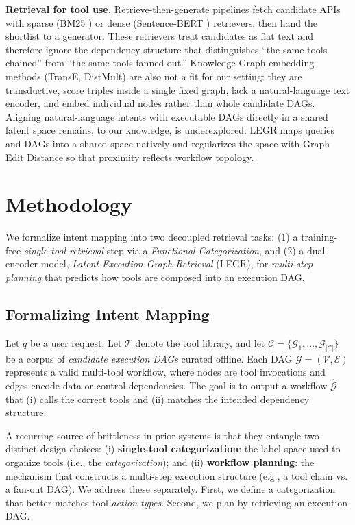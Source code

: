 \documentclass{article}
\begin{document}
\textbf{Retrieval for tool use.} Retrieve-then-generate pipelines fetch candidate APIs with sparse (BM25 \cite{robertson2009probabilistic}) or dense (Sentence-BERT \cite{reimers-gurevych-2019-sentence}) retrievers, then hand the shortlist to a generator. These retrievers treat candidates as flat text and therefore ignore the dependency structure that distinguishes ``the same tools chained'' from ``the same tools fanned out.'' Knowledge-Graph embedding methods (TransE, DistMult) are also not a fit for our setting: they are transductive, score triples inside a single fixed graph, lack a natural-language text encoder, and embed individual nodes rather than whole candidate DAGs. Aligning natural-language intents with executable DAGs directly in a shared latent space remains, to our knowledge, is underexplored. LEGR maps queries and DAGs into a shared space natively and regularizes the space with Graph Edit Distance \cite{sanfeliu1983distance} so that proximity reflects workflow topology.

\section{Methodology}

We formalize intent mapping into two decoupled retrieval tasks: (1) a training-free \emph{single-tool retrieval} step via a \emph{Functional Categorization}, and (2) a dual-encoder model, \textit{Latent Execution-Graph Retrieval} (LEGR), for \emph{multi-step planning} that predicts how tools are composed into an execution DAG.

\subsection{Formalizing Intent Mapping}
\label{sec:overview}
Let $q$ be a user request. Let $\mathcal{T}$ denote the tool library, and let $\mathcal{C} = \{\mathcal{G}_1,\dots,\mathcal{G}_{|\mathcal{C}|}\}$ be a corpus of \emph{candidate execution DAGs} curated offline. Each DAG $\mathcal{G}=(\mathcal{V},\mathcal{E})$ represents a valid multi-tool workflow, where nodes are tool invocations and edges encode data or control dependencies. The goal is to output a workflow $\hat{\mathcal{G}}$ that (i) calls the correct tools and (ii) matches the intended dependency structure.

A recurring source of brittleness in prior systems is that they entangle two distinct design choices:
(i) \textbf{single-tool categorization}: the label space used to organize tools (i.e., the \emph{categorization}); and
(ii) \textbf{workflow planning}: the mechanism that constructs a multi-step execution structure (e.g., a tool chain vs. a fan-out DAG).
We address these separately. First, we define a categorization that better matches tool \emph{action types}. Second, we plan by retrieving an execution DAG.
\end{document}
